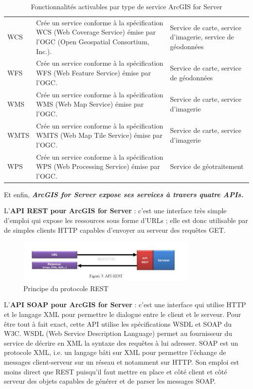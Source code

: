 \documentclass[11pt]{article}
\begin{document}
\begin{table}[H]
\begin{center}
\begin{tabular}{|m{3 cm}|p{7 cm}|p{3 cm}|}
			WCS & Crée un service conforme à la spécification WCS (Web Coverage Service) émise par l'OGC (Open Geospatial Consortium, Inc.). & Service de carte, service d'imagerie, service de géodonnées \\
			WFS & Crée un service conforme à la spécification WFS (Web Feature Service) émise par l'OGC. & Service de carte, service de géodonnées \\
			WMS & Crée un service conforme à la spécification WMS (Web Map Service) émise par l'OGC. & Service de carte, service d'imagerie \\
			WMTS & Crée un service conforme à la spécification WMTS (Web Map Tile Service) émise par l'OGC. & Service de carte, service d'imagerie \\
			WPS & Crée un service conforme à la spécification WPS (Web Processing Service) émise par l'OGC. &Service de géotraitement  \\
			\hline
		\end{tabular}
	\end{center}
	\caption{Fonctionnalités activables par type de service ArcGIS for Server} 
\end{table}
\newpage

Et enfin, \textbf{\emph{ArcGIS for Server expose ses services à travers quatre APIs.}}

L'\textbf{API REST pour ArcGIS for Server} : c'est une interface très simple d'emploi qui expose les ressources sous forme d'URLs ; elle est donc utilisable par de simples clients HTTP capables d'envoyer au serveur des requêtes GET.

\begin{figure}[H]
	\center \includegraphics[width=0.80\textwidth]{img/cours/api_rest.jpg}
	\caption{Principe du protocole REST}
\end{figure}

L'\textbf{API SOAP pour ArcGIS for Server} : c'est une interface qui utilise HTTP et le langage XML pour permettre le dialogue entre le client et le serveur. Pour être tout à fait exact, cette API utilise les spécifications WSDL et SOAP du W3C. WSDL (Web Service Description Language) permet au fournisseur du service de décrire en XML la syntaxe des requêtes à lui adresser. SOAP est un protocole XML, i.e. un langage bâti sur XML pour permettre l'échange de messages client-serveur sur un réseau et notamment sur HTTP. Son emploi est moins direct que REST puisqu'il faut mettre en place et côté client et côté serveur des objets capables de générer et de parser les messages SOAP.
\end{document}

